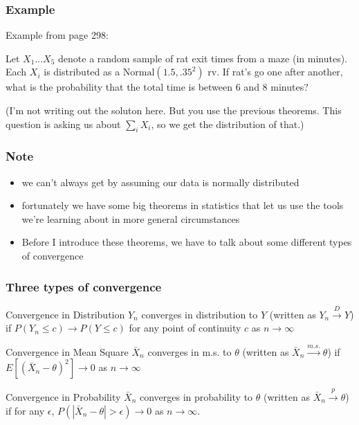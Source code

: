 \documentclass{beamer}
\begin{document}
\begin{frame}
\frametitle{Example}

Example from page 298: 
\newline

Let $X_1 \ldots X_5$ denote a random sample of rat exit times from a maze (in minutes). Each $X_i$ is distributed as a $\text{Normal}(1.5, .35^2)$ rv. If rat's go one after another, what is the probability that the total time is between 6 and 8 minutes?
\newline

(I'm not writing out the soluton here. But you use the previous theorems. This question is asking us about $\sum_i X_i$, so we get the distribution of that.)

\end{frame}
\begin{frame}
\frametitle{Note}

\begin{itemize}
\item we can't always get by assuming our data is normally distributed
\item fortunately we have some big theorems in statistics that let us use the tools we're learning about in more general circumstances
\item Before I introduce these theorems, we have to talk about some different types of convergence
\end{itemize}

\end{frame}




\begin{frame}
\frametitle{Three types of convergence}


\begin{block}{Convergence in Distribution}
$Y_n$ converges in distribution to $Y$ (written as $Y_n \overset{D}{\rightarrow} Y$) if $P(Y_n \le c) \rightarrow P(Y \le c)$ for any point of continuity $c$ as $n \rightarrow \infty$
\end{block}

\begin{block}{Convergence in Mean Square}
$\bar{X}_n$ converges in m.s. to $\theta$ (written as $\bar{X}_n \overset{m.s.}{\rightarrow} \theta$) if $E[(\bar{X}_n - \theta)^2] \rightarrow 0$ as $n \rightarrow \infty$
\end{block}

\begin{block}{Convergence in Probability}
$\bar{X}_n$ converges in probability to $\theta$ (written as $\bar{X}_n \overset{p}{\rightarrow} \theta$) if for any $\epsilon$, $P(|\bar{X}_n - \theta|> \epsilon) \rightarrow 0$ as $n \rightarrow \infty$.
\end{block}

\end{frame}
\end{document}
